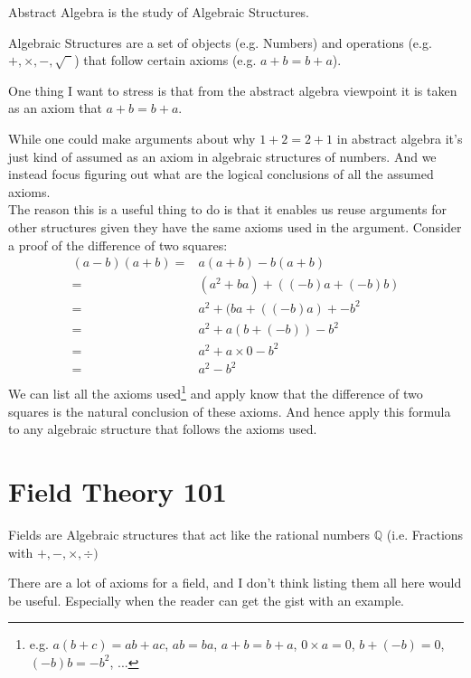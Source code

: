 \begin{displayquote}
Abstract Algebra is the study of Algebraic Structures.

Algebraic Structures are a set of objects (e.g. Numbers) and operations (e.g. $+,\times,-,\sqrt{\phantom{1}}$) that follow certain axioms (e.g. $a+b = b+a$).
\end{displayquote}

One thing I want to stress is that from the abstract algebra viewpoint it is taken as an axiom
that $a+b = b+a$.

While one could make arguments about why $1+2 = 2+1$ in abstract algebra it's just kind of assumed as an axiom in algebraic structures of numbers.
And we instead focus figuring out what are the logical conclusions of all the assumed axioms.
\\

The reason this is a useful thing to do is that it enables us reuse arguments for other structures given they have the same axioms used in the argument. 
Consider a proof of the difference of two squares:
\begin{equation*}
\begin{aligned}
	(a-b)(a+b) =& a(a+b)-b(a+b) \\
	=& (a^2+ba)+((-b)a+(-b)b) \\
	=& a^2+(ba+((-b)a)+-b^2 \\
	=& a^2+a(b+(-b))-b^2 \\
	=& a^2+a\times 0-b^2 \\
	=& a^2-b^2 \\
\end{aligned}
\end{equation*}
We can list all the axioms used\footnote{e.g. $a(b+c) = ab+ac$, $ab=ba$, $a+b = b+a$, $0\times a = 0$, $b+(-b) = 0$, $(-b)b = -b^2$, ...} and apply know that the difference of two squares is the natural conclusion of these axioms.
And hence apply this formula to any algebraic structure that follows the axioms used.

\section{Field Theory 101}
\begin{displayquote}
Fields are Algebraic structures that act like the rational numbers $\mathbb{Q}$ (i.e. Fractions with $+,-,\times,\div)$
\end{displayquote}
There are a lot of axioms for a field,
and I don't think listing them all here would be useful.
Especially when the reader can get the gist with an example.
\\

